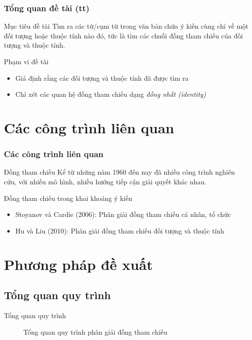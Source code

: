 \documentclass[9pt,xcolor=table,hyperref=unicode]{beamer}
\begin{document}
	\begin{frame}
		\frametitle{Tổng quan đề tài (tt)}
		\begin{block}{Mục tiêu đề tài}
			Tìm ra các từ/cụm từ trong văn bản chứa ý kiến cùng chỉ về một đối tượng hoặc thuộc tính nào đó, tức là tìm các chuỗi đồng tham chiếu của đối tượng và thuộc tính.
		\end{block}		
		\begin{block}{Phạm vi đề tài}
			\begin{itemize}
				\item{Giả định rằng các đối tượng và thuộc tính đã được tìm ra}
				\item{Chỉ xét các quan hệ đồng tham chiếu dạng \textit{đồng nhất (identity)}}
			\end{itemize}
		\end{block}
	\end{frame}


	\section{Các công trình liên quan}
	\begin{frame}
		\frametitle{Các công trình liên quan}
		\begin{block}{Đồng tham chiếu}
			Kể từ những năm 1960 đến nay đã nhiều công trình nghiên cứu, với nhiều mô hình, nhiều hướng tiếp cận giải quyết khác nhau.
		\end{block}
		\begin{block}{Đồng tham chiếu trong khai khoáng ý kiến}
			\begin{itemize}
				\item{Stoyanov và Cardie (2006): Phân giải đồng tham chiếu cá nhân, tổ chức}
				\item{Hu và Liu (2010): Phân giải đồng tham chiếu đối tượng và thuộc tính}
			\end{itemize}
		\end{block}		
	\end{frame}

	\section{Phương pháp đề xuất}
	\subsection{Tổng quan quy trình}
	\begin{frame}{Tổng quan quy trình}		
		\begin{figure}[H]
			\LARGE 
			\centering				
			\resizebox{100mm}{!}{}
			\caption{Tổng quan quy trình phân giải đồng tham chiếu}	
			\label{fig:generalmodel}						
		\end{figure}
	\end{frame}	
\end{document}
